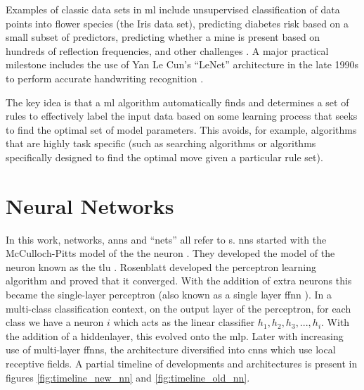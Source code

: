 Examples of classic data sets in \gls{ml} include unsupervised classification of data points into flower species (the Iris data set), predicting diabetes risk based on a small subset of predictors, predicting whether a mine is present based on hundreds of reflection frequencies, and other challenges \cite{uci_ml_data}. A major practical milestone includes the use of Yan Le Cun's \enquote{LeNet} architecture in the late 1990s to perform accurate handwriting recognition \cite{LeNet}. 
\bigskip

The key idea is that a \gls{ml} algorithm automatically finds and determines a set of rules to effectively label the input data based on some learning process that seeks to find the optimal set of model parameters. This avoids, for example, algorithms that are highly task specific (such as searching algorithms or algorithms specifically designed to find the optimal move given a particular rule set). 
\bigskip

\section{Neural Networks} 

In this work, networks, \gls{ann}s and \enquote{nets} all refer to s. \gls{nn}s started with the McCulloch-Pitts model of the the neuron \cite{logical_calculus}. They developed the model of the neuron known as the \gls{tlu} \cite{tlu_tutorial}. Rosenblatt developed the perceptron learning algorithm and proved that it converged. With the addition of extra neurons this became the single-layer perceptron (also known as a single layer \gls{ffnn} \cite{haykin}). In a multi-class classification context, on the output layer of the perceptron, for each class we have a neuron $i$ which acts as the linear classifier $h_1, h_2, h_3, ... , h_i$. With the addition of a \gls{hiddenlayer}, this evolved onto the \gls{mlp}. Later with increasing use of multi-layer \gls{ffnn}s, the architecture diversified into \gls{cnn}s which use local receptive fields. A partial timeline of developments and architectures is present in figures \ref{fig:timeline_new_nn} and \ref{fig:timeline_old_nn}. \bigskip

